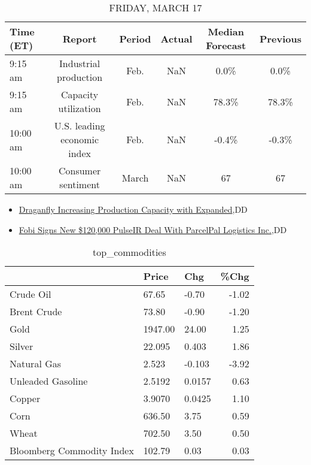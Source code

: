 \documentclass{article}%
\begin{document}
%


\begin{table}[htbp]%
\caption{FRIDAY, MARCH 17}%
\centering%
\begin{adjustbox}{width=1\textwidth}%
\begin{tabular}{lccccc}
\toprule
Time (ET) &                      Report & Period & Actual & Median Forecast & Previous \\
\midrule
  9:15 am &       Industrial production &   Feb. &    NaN &            0.0\% &     0.0\% \\
  9:15 am &        Capacity utilization &   Feb. &    NaN &           78.3\% &    78.3\% \\
 10:00 am & U.S. leading economic index &   Feb. &    NaN &           -0.4\% &    -0.3\% \\
 10:00 am &          Consumer sentiment &  March &    NaN &              67 &       67 \\
\bottomrule
\end{tabular}
%
\end{adjustbox}%
\end{table}

%
\begin{itemize}%
\item%
\href{https://reddit.com/r/Baystreetbets/comments/11sy743/draganfly\_increasing\_production\_capacity\_with/}{Draganfly Increasing Production Capacity with Expanded},DD%
\item%
\href{https://reddit.com/r/Baystreetbets/comments/11sth4f/fobi\_signs\_new\_120000\_pulseir\_deal\_with\_parcelpal/}{Fobi Signs New \$120,000 PulseIR Deal With ParcelPal Logistics Inc.},DD%
\end{itemize}%


\begin{table}[htbp]%
\caption{top\_commodities}%
\centering%
\begin{adjustbox}{width=1\textwidth}%
\begin{tabular}{lllr}
\toprule
                          &   Price &    Chg &  \%Chg \\
\midrule
               Crude Oil  &   67.65 &  -0.70 & -1.02 \\
             Brent Crude  &   73.80 &  -0.90 & -1.20 \\
                    Gold  & 1947.00 &  24.00 &  1.25 \\
                  Silver  &  22.095 &  0.403 &  1.86 \\
             Natural Gas  &   2.523 & -0.103 & -3.92 \\
       Unleaded Gasoline  &  2.5192 & 0.0157 &  0.63 \\
                  Copper  &  3.9070 & 0.0425 &  1.10 \\
                    Corn  &  636.50 &   3.75 &  0.59 \\
                   Wheat  &  702.50 &   3.50 &  0.50 \\
Bloomberg Commodity Index &  102.79 &   0.03 &  0.03 \\
\bottomrule
\end{tabular}
%
\end{adjustbox}%
\end{table}
\end{document}
